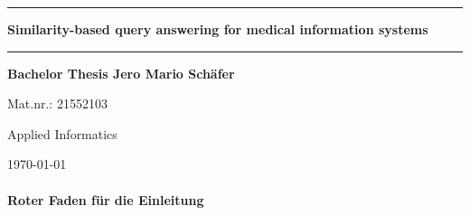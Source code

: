 
\newpage
\thispagestyle{empty}
\newcommand{\Rule}{\rule{\textwidth}{1mm}}

\begin{center}

\Rule\vspace{5mm}
\sffamily\bfseries\Huge
Similarity-based query answering for medical information systems
\vspace{1mm}\Rule
\vfill
\sffamily\bfseries\LARGE Bachelor Thesis
\vfill
\sffamily\bfseries\Large Jero Mario Schäfer\par Mat.nr.: 21552103\par Applied Informatics\par
\vfill

\raisebox{7mm}{Georg-August-University}
\raisebox{7mm}{Göttingen}\par
\vfill
\today
\end{center}


\newpage



\paragraph{Roter Faden für die Einleitung}

